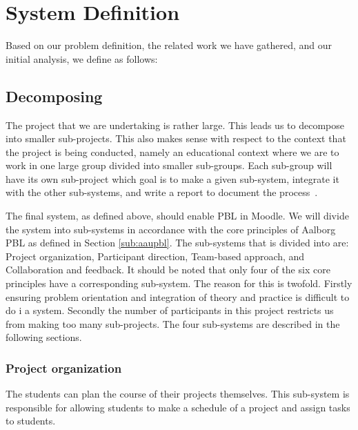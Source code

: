 \section{System Definition}
\label{sec:systemDef}
Based on our problem definition, the related work we have gathered, and our initial analysis, we define \system as follows:




\subsection{Decomposing \system}
\label{sub:decomposingSys}
The project that we are undertaking is rather large.
This leads us to decompose into smaller sub-projects.
This also makes sense with respect to the context that the project is being conducted, namely an educational context where we are to work in one large group divided into smaller sub-groups.
Each sub-group will have its own sub-project which goal is to make a given sub-system, integrate it with the other sub-systems, and write a report to document the process~\cite{sw6studieordning}.

The final system, as defined above, should enable PBL in Moodle.
We will divide the system into sub-systems in accordance with the core principles of Aalborg PBL as defined in Section \ref{sub:aaupbl}.
The sub-systems that \system is divided into are:
Project organization,
Participant direction,
Team-based approach, and
Collaboration and feedback.
It should be noted that only four of the six core principles have a corresponding sub-system.
The reason for this is twofold.
Firstly ensuring problem orientation and integration of theory and practice is difficult to do i a system.
Secondly the number of participants in this project restricts us from making too many sub-projects.
The four sub-systems are described in the following sections.

\subsubsection{Project organization}
The students can plan the course of their projects themselves.
This sub-system is responsible for allowing students to make a schedule of a project and assign tasks to students.

